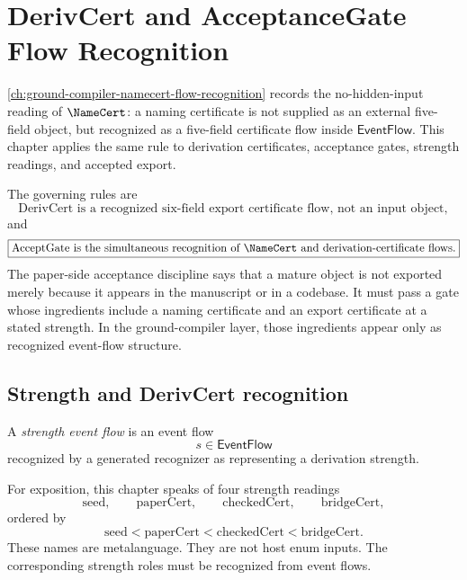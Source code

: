 \chapter{DerivCert and AcceptanceGate Flow Recognition}
\label{ch:ground-compiler-derivcert-acceptance-flow}

\autoref{ch:ground-compiler-namecert-flow-recognition} records the no-hidden-input reading of $\NameCert$: a naming certificate is not supplied as an external five-field object, but recognized as a five-field certificate flow inside $\mathsf{EventFlow}$. This chapter applies the same rule to derivation certificates, acceptance gates, strength readings, and accepted export.

The governing rules are
$$
  \boxed{\text{$\mathrm{DerivCert}$ is a recognized six-field export certificate flow, not an input object},}
$$
and
$$
  \boxed{\text{$\mathrm{AcceptGate}$ is the simultaneous recognition of $\NameCert$ and derivation-certificate flows}.}
$$
The paper-side acceptance discipline says that a mature object is not exported merely because it appears in the manuscript or in a codebase. It must pass a gate whose ingredients include a naming certificate and an export certificate at a stated strength. In the ground-compiler layer, those ingredients appear only as recognized event-flow structure.

\section{Strength and DerivCert recognition}
\label{sec:derivcert-generated-strength-and-recognition}

\begin{definition}
\label{def:derivcert-generated-strength-event-flow}
A \emph{strength event flow} is an event flow
$$
  s \in \mathsf{EventFlow}
$$
recognized by a generated recognizer as representing a derivation strength.

For exposition, this chapter speaks of four strength readings
$$
  \mathrm{seed},\qquad
  \mathrm{paperCert},\qquad
  \mathrm{checkedCert},\qquad
  \mathrm{bridgeCert},
$$
ordered by
$$
  \mathrm{seed}
  <
  \mathrm{paperCert}
  <
  \mathrm{checkedCert}
  <
  \mathrm{bridgeCert}.
$$
These names are metalanguage. They are not host enum inputs. The corresponding strength roles must be recognized from event flows.
\end{definition}

